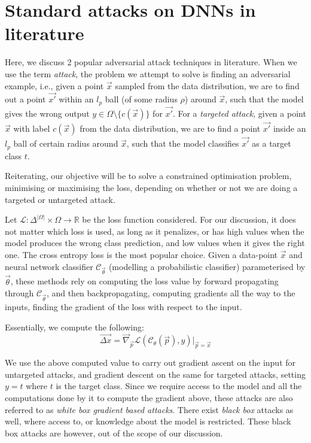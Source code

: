 \documentclass{ociamthesis}
\begin{document}
\section{Standard attacks on DNNs in literature}
\label{section:standard-attacks}

Here, we discuss 2 popular adversarial attack techniques in literature. When we
use the term \emph{attack}, the problem we attempt to solve is finding an
adversarial example, i.e., given a point $\vec{x}$ sampled from the data
distribution, we are to find out a point $\vec{x'}$ within an $l_p$ ball (of
some radius $\rho$) around $\vec{x}$, such that the model gives the wrong output
$y \in \Omega \setminus \{c(\vec{x})\}$ for $\vec{x'}$. For a \emph{targeted
attack}, given a point $\vec{x}$ with label $c(\vec{x})$ from the data
distribution, we are to find a point $\vec{x'}$ inside an $l_p$ ball of certain
radius around $\vec{x}$, such that the model classifies $\vec{x'}$ as a target
class $t$.

Reiterating, our objective will be to solve a constrained optimisation problem,
minimising or maximising the loss, depending on whether or not we are doing a
targeted or untargeted attack.

Let $\mathcal{L}: \Delta^{|\Omega|} \times \Omega \to \mathbb{R}$ be the loss
function considered. For our discussion, it does not matter which loss is used,
as long as it penalizes, or has high values when the model produces the wrong
class prediction, and low values when it gives the right one. The cross entropy
loss is the most popular choice. Given a data-point $\vec{x}$ and neural network
classifier $\mathcal{C}_\vec{\theta}$ (modelling a probabilistic classifier)
parameterised by $\vec{\theta}$, these methods rely on computing the loss value
by forward propagating through $\mathcal{C}_\vec{\theta}$, and then
backpropagating, computing gradients all the way to the inputs, finding the
gradient of the loss with respect to the input.

Essentially, we compute the following:
\begin{equation*}
    \vec{\Delta x}
    = \vec{\nabla}_\vec{p} \mathcal{L}(\mathcal{C}_\theta (\vec{p}), y)
    \bigr \rvert_{\vec{p}=\vec{x}}
\end{equation*}

We use the above computed value to carry out gradient ascent on the input for
untargeted attacks, and gradient descent on the same for targeted attacks,
setting $y=t$ where $t$ is the target class. Since we require access to the
model and all the computations done by it to compute the gradient above, these
attacks are also referred to as \emph{white box gradient based attacks}. There
exist \emph{black box} \citep{simba,genattack,prior-conv} attacks as well, where
access to, or knowledge about the model is restricted. These black box attacks
are however, out of the scope of our discussion.
\end{document}
